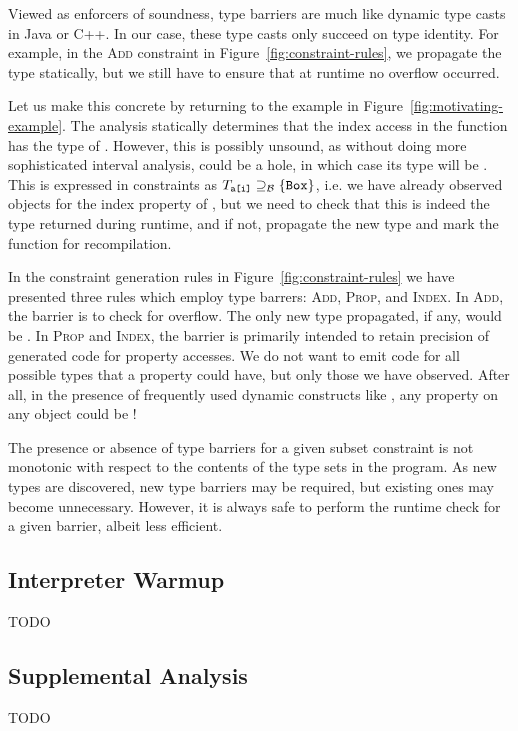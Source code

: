 Viewed as enforcers of soundness, type barriers are much like dynamic type
casts in Java or C++. In our case, these type casts only succeed on type
identity. For example, in the \textsc{Add} constraint in
Figure~\ref{fig:constraint-rules}, we propagate the  type
statically, but we still have to ensure that at runtime no overflow occurred.

Let us make this concrete by returning to the example in
Figure~\ref{fig:motivating-example}. The analysis statically determines that
the index access  in the function  has the type of
. However, this is possibly unsound, as without doing more
sophisticated interval analysis,  could be a hole, in which case
its type will be . This is expressed in constraints as
$T_{\texttt{a[i]}} \supseteq_\mathcal{B} \{\texttt{Box}\}$, i.e. we have already observed
 objects for the index property of , but we need to check
that this is indeed the type returned during runtime, and if not, propagate
the new type and mark the function for recompilation.

In the constraint generation rules in Figure~\ref{fig:constraint-rules} we
have presented three rules which employ type barrers: \textsc{Add},
\textsc{Prop}, and \textsc{Index}. In \textsc{Add}, the barrier is to check
for overflow. The only new type propagated, if any, would be . In
\textsc{Prop} and \textsc{Index}, the barrier is primarily intended to retain
precision of generated code for property accesses. We do not want to emit code
for all possible types that a property could have, but only those we have
observed. After all, in the presence of frequently used dynamic constructs
like , any property on any object could be !

The presence or absence of type barriers for a given subset constraint is not
monotonic with respect to the contents of the type sets in the program.  As
new types are discovered, new type barriers may be required, but existing ones
may become unnecessary.  However, it is always safe to perform the runtime
check for a given barrier, albeit less efficient.

\subsection{Interpreter Warmup}

TODO

\subsection{Supplemental Analysis}

TODO

